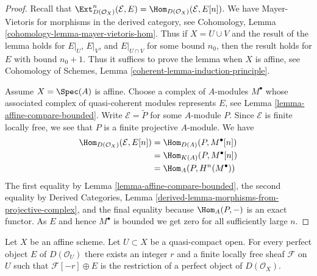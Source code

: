 \begin{proof}
Recall that $\Ext^n_{D(\mathcal{O}_X)}(\mathcal{E}, E) =
\Hom_{D(\mathcal{O}_X)}(\mathcal{E}, E[n])$. We have
Mayer-Vietoris for morphisms in the derived category, see
Cohomology, Lemma \ref{cohomology-lemma-mayer-vietoris-hom}.
Thus if $X = U \cup V$ and the result of the lemma holds
for $E|_U$, $E|_V$, and $E|_{U \cap V}$ for some bound $n_0$,
then the result holds for $E$ with bound $n_0 + 1$.
Thus it suffices to prove the lemma when $X$ is affine, see
Cohomology of Schemes, Lemma \ref{coherent-lemma-induction-principle}.

\medskip\noindent
Assume $X = \Spec(A)$ is affine. Choose a complex of $A$-modules
$M^\bullet$ whose associated complex of quasi-coherent modules
represents $E$, see Lemma \ref{lemma-affine-compare-bounded}.
Write $\mathcal{E} = \widetilde{P}$ for some $A$-module $P$.
Since $\mathcal{E}$ is finite locally free, we see that $P$
is a finite projective $A$-module. We have
\begin{align*}
\Hom_{D(\mathcal{O}_X)}(\mathcal{E}, E[n])
& = 
\Hom_{D(A)}(P, M^\bullet[n]) \\
& =
\Hom_{K(A)}(P, M^\bullet[n]) \\
& =
\Hom_A(P, H^n(M^\bullet))
\end{align*}
The first equality by Lemma \ref{lemma-affine-compare-bounded},
the second equality by
Derived Categories, Lemma
\ref{derived-lemma-morphisms-from-projective-complex}, and
the final equality because $\Hom_A(P, -)$ is an exact functor.
As $E$ and hence $M^\bullet$ is bounded
we get zero for all sufficiently large $n$.
\end{proof}

\begin{lemma}
\label{lemma-lift-perfect-complex-plus-locally-free}
Let $X$ be an affine scheme. Let $U \subset X$ be a quasi-compact open.
For every perfect object $E$ of $D(\mathcal{O}_U)$ there exists an integer
$r$ and a finite locally free sheaf $\mathcal{F}$ on $U$ such that
$\mathcal{F}[-r] \oplus E$ is the restriction of a perfect object of
$D(\mathcal{O}_X)$.
\end{lemma}

